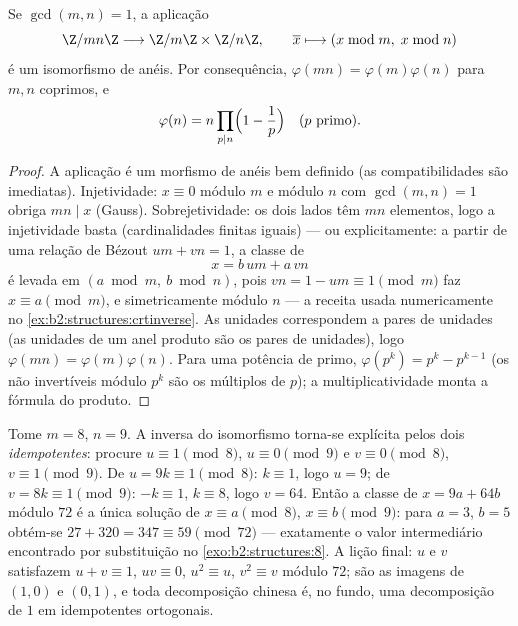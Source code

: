\begin{theorem}\label{thm:b2:structures:crt}
Se $\gcd(m, n) = 1$, a aplicação
\[
\Z/mn\Z \longrightarrow \Z/m\Z \times \Z/n\Z,
\qquad
\overline{x} \longmapsto (x \bmod m,\; x \bmod n)
\]
é um isomorfismo de anéis. Por consequência,
$\varphi(mn) = \varphi(m)\varphi(n)$ para $m, n$ coprimos, e
\[
\varphi(n) = n \prod_{p \mid n} \Bigl(1 - \frac 1p\Bigr)
\quad (p \text{ primo}).
\]
\end{theorem}

\begin{proof}
A aplicação é um morfismo de anéis bem definido (as compatibilidades são
imediatas). Injetividade: $x \equiv 0$ módulo $m$ e módulo $n$ com
$\gcd(m,n) = 1$ obriga $mn \mid x$ (Gauss). Sobrejetividade: os dois lados
têm $mn$ elementos, logo a injetividade basta (cardinalidades
finitas iguais) --- ou explicitamente: a partir de uma relação de Bézout $um +
vn = 1$, a classe de
\[
x = b\,um + a\,vn
\]
é levada em $(a \bmod m,\ b \bmod n)$, pois $vn = 1 - um \equiv 1
\pmod m$ faz $x \equiv a \pmod m$, e simetricamente módulo $n$
--- a receita usada numericamente no
\cref{ex:b2:structures:crtinverse}. As unidades correspondem a pares de unidades (as unidades de um anel produto
são os pares de unidades), logo $\varphi(mn) =
\varphi(m)\varphi(n)$. Para uma potência de primo, $\varphi(p^k) = p^k -
p^{k-1}$ (os não invertíveis módulo $p^k$ são os múltiplos de $p$);
a multiplicatividade monta a fórmula do produto.
\end{proof}

\begin{example}\label{ex:b2:structures:crtinverse}
Tome $m = 8$, $n = 9$. A inversa do isomorfismo torna-se
explícita pelos dois \emph{idempotentes}: procure $u \equiv 1 \pmod 8$,
$u \equiv 0 \pmod 9$ e $v \equiv 0 \pmod 8$, $v \equiv 1 \pmod
9$. De $u = 9k \equiv 1 \pmod 8$: $k \equiv 1$, logo $u = 9$; de
$v = 8k \equiv 1 \pmod 9$: $-k \equiv 1$, $k \equiv 8$, logo $v =
64$. Então a classe de $x = 9a + 64b$ módulo $72$ é a única
solução de $x \equiv a \pmod 8$, $x \equiv b \pmod 9$: para $a =
3$, $b = 5$ obtém-se $27 + 320 = 347 \equiv 59 \pmod{72}$ ---
exatamente o valor intermediário encontrado por substituição no
\cref{exo:b2:structures:8}. A lição final: $u$ e $v$
satisfazem $u + v \equiv 1$, $uv \equiv 0$, $u^2 \equiv u$, $v^2
\equiv v$ módulo $72$; são as imagens de $(1, 0)$ e $(0,
1)$, e toda decomposição chinesa é, no fundo, uma decomposição
de $1$ em idempotentes ortogonais.
\end{example}

